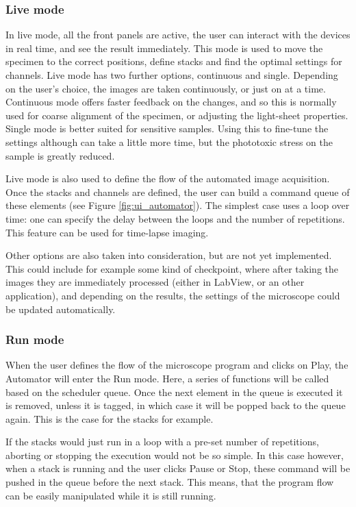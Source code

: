 \documentclass{tdk_style}
\begin{document}
\subsubsection{Live mode}
\label{automator:live}
In live mode, all the front panels are active, the user can interact with the devices in real time, and see the result immediately. This mode is used to move the specimen to the correct positions, define stacks and find the optimal settings for channels. Live mode has two further options, continuous and single. Depending on the user's choice, the images are taken continuously, or just on at a time. Continuous mode offers faster feedback on the changes, and so this is normally used for coarse alignment of the specimen, or adjusting the light-sheet properties. Single mode is better suited for sensitive samples. Using this to fine-tune the settings although can take a little more time, but the phototoxic stress on the sample is greatly reduced.

Live mode is also used to define the flow of the automated image acquisition. Once the stacks and channels are defined, the user can build a command queue of these elements (see Figure \ref{fig:ui_automator}). The simplest case uses a loop over time: one can specify the delay between the loops and the number of repetitions. This feature can be used for time-lapse imaging. 

Other options are also taken into consideration, but are not yet implemented. This could include for example some kind of checkpoint, where after taking the images they are immediately processed (either in LabView, or an other application), and depending on the results, the settings of the microscope could be updated automatically.


\subsubsection{Run mode}
When the user defines the flow of the microscope program and clicks on Play, the Automator will enter the Run mode. Here, a series of functions will be called based on the scheduler queue. Once the next element in the queue is executed it is removed, unless it is tagged, in which case it will be popped back to the queue again. This is the case for the stacks for example.

If the stacks would just run in a loop with a pre-set number of repetitions, aborting or stopping the execution would not be so simple. In this case however, when a stack is running and the user clicks Pause or Stop, these command will be pushed in the queue before the next stack. This means, that the program flow can be easily manipulated while it is still running.
 
\end{document}
